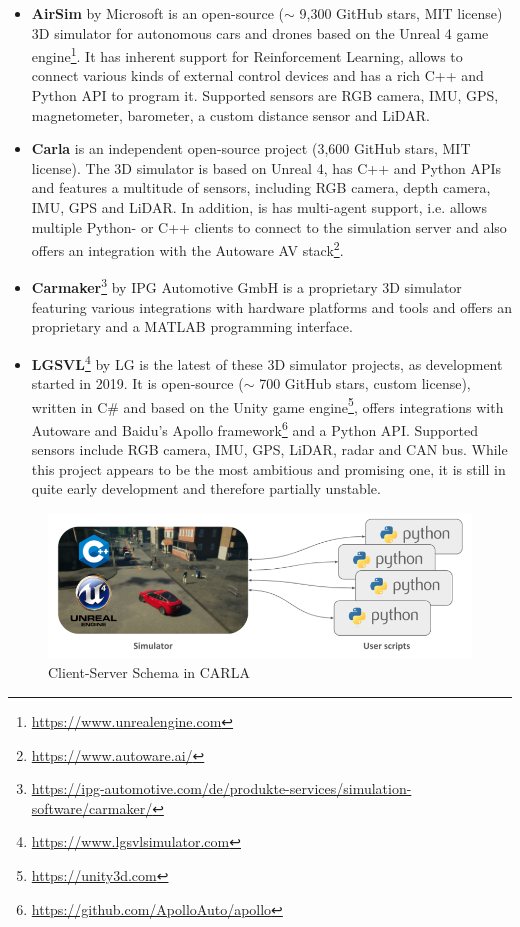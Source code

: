 \begin{itemize}
	\item \textbf{AirSim} by Microsoft \cite{airsim2017fsr} is an open-source ($\sim$ 9,300 GitHub stars, MIT license) 3D simulator for autonomous cars and drones based on the Unreal 4 game engine\footnote{\url{https://www.unrealengine.com}}. It has inherent support for Reinforcement Learning, allows to connect various kinds of external control devices and has a rich C++ and Python API to program it. Supported sensors are RGB camera, IMU, GPS, magnetometer, barometer, a custom distance sensor and LiDAR. 
	\item \textbf{Carla} \cite{Dosovitskiy17} is an independent open-source project (3,600 GitHub stars, MIT license). The 3D simulator is based on Unreal 4, has C++ and Python APIs and features a multitude of sensors, including RGB camera, depth camera, IMU, GPS and LiDAR. In addition, is has multi-agent support, i.e. allows multiple Python- or C++ clients to connect to the simulation server and also offers an integration with the Autoware AV stack\footnote{\url{https://www.autoware.ai/}}.
	\item \textbf{Carmaker}\footnote{\url{https://ipg-automotive.com/de/produkte-services/simulation-software/carmaker/}} by IPG Automotive GmbH is a proprietary 3D simulator featuring various integrations with hardware platforms and tools and offers an proprietary and a MATLAB programming interface.
	\item \textbf{LGSVL}\footnote{\url{https://www.lgsvlsimulator.com}} by LG is the latest of these 3D simulator projects, as development started in 2019. It is open-source ($\sim$ 700 GitHub stars, custom license), written in C\# and based on the Unity game engine\footnote{\url{https://unity3d.com}}, offers integrations with Autoware and Baidu's Apollo framework\footnote{\url{https://github.com/ApolloAuto/apollo}} and a Python API. Supported sensors include RGB camera, IMU, GPS, LiDAR, radar and CAN bus. While this project appears to be the most ambitious and promising one, it is still in quite early development and therefore partially unstable.
\end{itemize}

\begin{figure}
	\centering
	\includegraphics[width=0.8\linewidth]{98_images/carla_modules}
	\caption[Client-Server Schema in CARLA]{Client-Server Schema in CARLA \cite{CarlaContributors}}
	\label{fig:carla_modules}
\end{figure}

